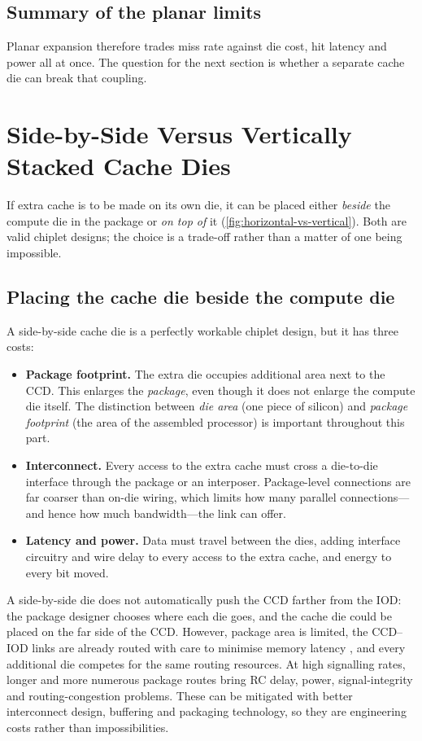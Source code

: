 \subsection{Summary of the planar limits}
Planar expansion therefore trades miss rate against die cost, hit latency and power all at once. The question for the next section is whether a separate cache die can break that coupling.

\section{Side-by-Side Versus Vertically Stacked Cache Dies}
\label{sec:horizontal-vs-vertical}

If extra cache is to be made on its own die, it can be placed either \emph{beside} the compute die in the package or \emph{on top of} it (\cref{fig:horizontal-vs-vertical}). Both are valid chiplet designs; the choice is a trade-off rather than a matter of one being impossible.



\subsection{Placing the cache die beside the compute die}
A side-by-side cache die is a perfectly workable chiplet design, but it has three costs:
\begin{itemize}
  \item \textbf{Package footprint.} The extra die occupies additional area next to the CCD. This enlarges the \emph{package}, even though it does not enlarge the compute die itself. The distinction between \emph{die area} (one piece of silicon) and \emph{package footprint} (the area of the assembled processor) is important throughout this part.
  \item \textbf{Interconnect.} Every access to the extra cache must cross a die-to-die interface through the package or an interposer. Package-level connections are far coarser than on-die wiring, which limits how many parallel connections---and hence how much bandwidth---the link can offer.
  \item \textbf{Latency and power.} Data must travel between the dies, adding interface circuitry and wire delay to every access to the extra cache, and energy to every bit moved.
\end{itemize}

A side-by-side die does not automatically push the CCD farther from the IOD: the package designer chooses where each die goes, and the cache die could be placed on the far side of the CCD. However, package area is limited, the CCD--IOD links are already routed with care to minimise memory latency \cite{naffziger2020chiplet}, and every additional die competes for the same routing resources. At high signalling rates, longer and more numerous package routes bring RC delay, power, signal-integrity and routing-congestion problems. These can be mitigated with better interconnect design, buffering and packaging technology, so they are engineering costs rather than impossibilities.

